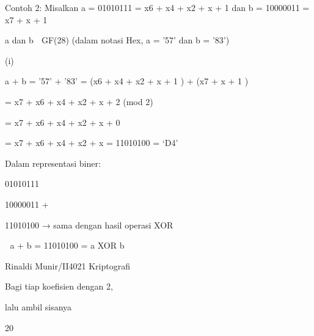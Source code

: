 \documentclass{article}
\begin{document}

Contoh 2:  Misalkan a = 01010111 = x6 + x4 + x2 + x + 1  dan b = 10000011 = x7 + x + 1 


        a dan b  GF(28)   (dalam notasi Hex, a = ’57’ dan b = ’83’)

(i)

a + b = ’57’ + ’83’  =  (x6 + x4 + x2 + x + 1 ) +  (x7 + x + 1 ) 




= x7 + x6 + x4 + x2 + x + 2 (mod 2)



             = x7 + x6 + x4 + x2 + x  + 0




= x7 + x6 + x4 + x2 + x  = 11010100 = ‘D4’


Dalam representasi biner:


 01010111


 10000011 +


 11010100  → sama dengan hasil operasi XOR


 a + b = 11010100 = a XOR b 

Rinaldi Munir/II4021 Kriptografi

Bagi  tiap koefisien dengan 2,

lalu ambil sisanya

20
\end{document}
